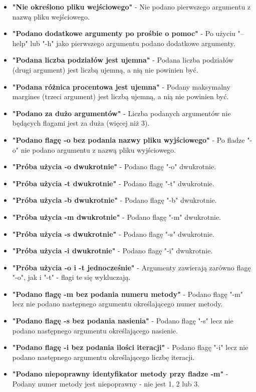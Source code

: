 \documentclass{article}
\begin{document}
\begin{itemize}
    \item \textbf{"Nie określono pliku wejściowego"} - Nie podano pierwszego argumentu z nazwą pliku wejściowego.
    \item \textbf{"Podano dodatkowe argumenty po prośbie o pomoc"} - Po użyciu "--help" lub "-h" jako pierwszego argumentu podano dodatkowe argumenty.
    \item \textbf{"Podana liczba podziałów jest ujemna"} - Podana liczba podziałów (drugi argument) jest liczbą ujemną, a nią nie powinien być.
    \item \textbf{"Podana różnica procentowa jest ujemna"} - Podany maksymalny margines (trzeci argument) jest liczbą ujemną, a nią nie powinien być.
    \item \textbf{"Podano za dużo argumentów"} - Liczba podanych argumentów nie będących flagami jest za duża (więcej niż 3).
    \item \textbf{"Podano flagę -o bez podania nazwy pliku wyjściowego"} - Po fladze "-o" nie podano argumentu z nazwą pliku wyjściowego.
    \item \textbf{"Próba użycia -o dwukrotnie"} - Podano flagę "-o" dwukrotnie.
    \item \textbf{"Próba użycia -t dwukrotnie"} - Podano flagę "-t" dwukrotnie.
    \item \textbf{"Próba użycia -b dwukrotnie"} - Podano flagę "-b" dwukrotnie.
    \item \textbf{"Próba użycia -m dwukrotnie"} - Podano flagę "-m" dwukrotnie.
    \item \textbf{"Próba użycia -s dwukrotnie"} - Podano flagę "-s" dwukrotnie.
    \item \textbf{"Próba użycia -i dwukrotnie"} - Podano flagę "-i" dwukrotnie.
    \item \textbf{"Próba użycia -o i -t jednocześnie"} - Argumenty zawierają zarówno flagę "-o", jak i "-t" - flagi te się wykluczają.
    \item \textbf{"Podano flagę -m bez podania numeru metody"} - Podano flagę "-m" lecz nie podano następnego argumentu określającego numer metody.
    \item \textbf{"Podano flagę -s bez podania nasienia"} - Podano flagę "-s" lecz nie podano następnego argumentu określającego nasienie.
    \item \textbf{"Podano flagę -i bez podania ilości iteracji"} - Podano flagę "-i" lecz nie podano następnego argumentu określającego liczbę iteracji.
    \item \textbf{"Podano niepoprawny identyfikator metody przy fladze -m"} - Podany numer metody jest niepoprawny - nie jest 1, 2 lub 3.

\end{itemize}
\end{document}
